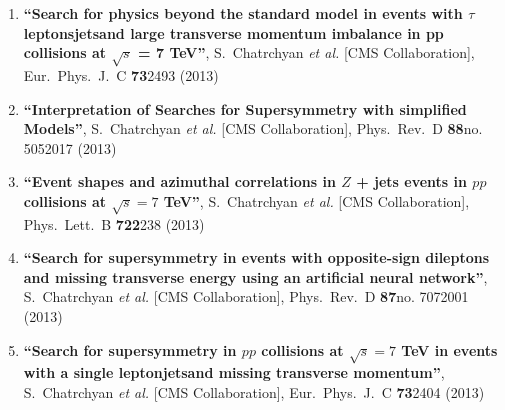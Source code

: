 \begin{enumerate}
\item%
{\bf ``Search for physics beyond the standard model in events with $\tau$ leptonsjetsand large transverse momentum imbalance in pp collisions at $\sqrt{s}$ = 7 TeV''}, 
  S.~Chatrchyan {\it et al.}  [CMS Collaboration], 
Eur.\ Phys.\ J.\ C {\bf 73}2493 (2013) %


\item%
{\bf ``Interpretation of Searches for Supersymmetry with simplified Models''}, 
  S.~Chatrchyan {\it et al.}  [CMS Collaboration], 
Phys.\ Rev.\ D {\bf 88}no. 5052017 (2013) %


\item%
{\bf ``Event shapes and azimuthal correlations in $Z$ + jets events in $pp$ collisions at $\sqrt{s}=7$ TeV''}, 
  S.~Chatrchyan {\it et al.}  [CMS Collaboration], 
Phys.\ Lett.\ B {\bf 722}238 (2013) %


\item%
{\bf ``Search for supersymmetry in events with opposite-sign dileptons and missing transverse energy using an artificial neural network''}, 
  S.~Chatrchyan {\it et al.}  [CMS Collaboration], 
Phys.\ Rev.\ D {\bf 87}no. 7072001 (2013) %


\item%
{\bf ``Search for supersymmetry in $pp$ collisions at $\sqrt{s}=7$ TeV in events with a single leptonjetsand missing transverse momentum''}, 
  S.~Chatrchyan {\it et al.}  [CMS Collaboration], 
Eur.\ Phys.\ J.\ C {\bf 73}2404 (2013) %



\end{enumerate}

